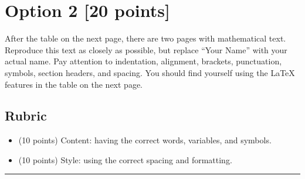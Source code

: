 \newpage
\section*{Option 2 [20 points]}
After the table on the next page, there are two pages with mathematical text.
Reproduce this text as closely as possible, but replace ``Your Name'' with your actual name.
Pay attention to indentation, alignment, brackets, punctuation, symbols, section headers, and spacing.
You should find yourself using the \LaTeX{} features in the table on the next page.

\subsection*{Rubric}
\begin{itemize}
    \item (10 points) Content: having the correct words, variables, and symbols.
    \item (10 points) Style: using the correct spacing and formatting.
\end{itemize}

\begin{center}\rule{0.8\textwidth}{.4pt}\end{center}

